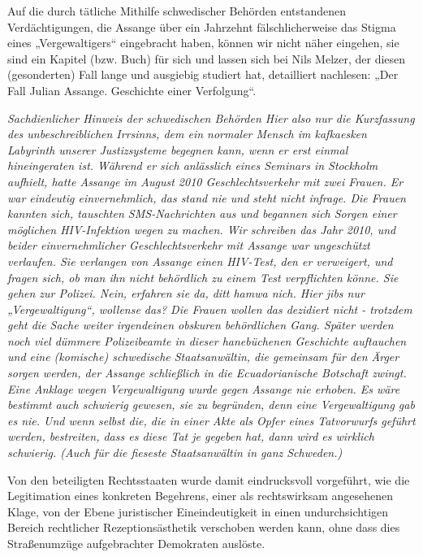 \begin{multicols}{2}
Auf die durch tätliche Mithilfe schwedischer Behörden
entstandenen Verdächtigungen, die Assange über ein
Jahrzehnt fälschlicherweise das Stigma eines „Vergewaltigers“ eingebracht haben, können wir nicht näher
eingehen, sie sind ein Kapitel (bzw. Buch) für sich und
lassen sich bei Nils Melzer, der diesen (gesonderten) Fall
lange und ausgiebig studiert hat, detailliert nachlesen:
„Der Fall Julian Assange. Geschichte einer Verfolgung“.

\textit{Sachdienlicher Hinweis der schwedischen Behörden \linebreak
Hier also nur die Kurzfassung des unbeschreiblichen Irrsinns, dem ein normaler Mensch im kafkaesken Labyrinth unserer Justizsysteme begegnen kann, wenn er erst
einmal hineingeraten ist. Während er sich anlässlich
eines Seminars in Stockholm aufhielt, hatte Assange im
August 2010 Geschlechtsverkehr mit zwei Frauen. Er war
eindeutig einvernehmlich, das stand nie und steht nicht
infrage. Die Frauen kannten sich, tauschten SMS-Nachrichten aus und begannen sich Sorgen einer möglichen
HIV-Infektion wegen zu machen. Wir schreiben das Jahr
2010, und beider einvernehmlicher Geschlechtsverkehr
mit Assange war ungeschützt verlaufen. Sie verlangen
von Assange einen HIV-Test, den er verweigert, und fragen
sich, ob man ihn nicht behördlich zu einem Test verpflichten könne. Sie gehen zur Polizei. Nein, erfahren sie da, ditt
hamwa nich. Hier jibs nur „Vergewaltigung“, wollense
das? Die Frauen wollen das dezidiert nicht - trotzdem
geht die Sache weiter irgendeinen obskuren behördlichen
Gang. Später werden noch viel dümmere Polizeibeamte
in dieser hanebüchenen Geschichte auftauchen und eine
(komische) schwedische Staatsanwältin, die gemeinsam
für den Ärger sorgen werden, der Assange schließlich in
die Ecuadorianische Botschaft zwingt. Eine Anklage wegen Vergewaltigung wurde gegen Assange nie erhoben. Es
wäre bestimmt auch schwierig gewesen, sie zu begründen,
denn eine Vergewaltigung gab es nie. Und wenn selbst die,
die in einer Akte als Opfer eines Tatvorwurfs geführt werden, bestreiten, dass es diese Tat je gegeben hat, dann wird
es wirklich schwierig. (Auch für die fieseste Staatsanwältin in ganz Schweden.)}

Von den beteiligten Rechtsstaaten wurde damit eindrucksvoll vorgeführt, wie die Legitimation eines konkreten Begehrens, einer als rechtswirksam angesehenen
Klage, von der Ebene juristischer Eineindeutigkeit in
einen undurchsichtigen Bereich rechtlicher Rezeptionsästhetik verschoben werden kann, ohne dass dies Straßenumzüge aufgebrachter Demokraten auslöste.


\end{multicols}
